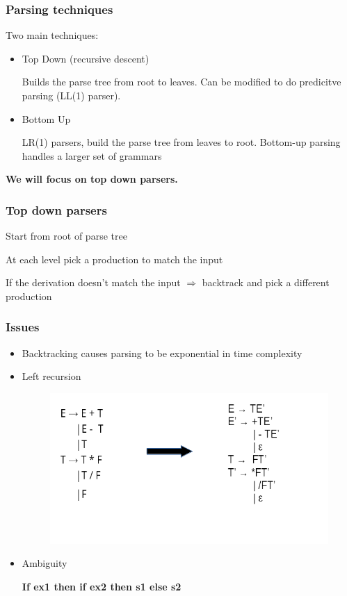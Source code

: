\begin{frame}
    \frametitle{Parsing techniques}
    Two main techniques:
    \begin{itemize}
        \item Top Down (recursive descent)
        
        Builds the parse tree from root to leaves. 
        Can be modified to do predicitve parsing (LL(1) parser).
        \item Bottom Up
        
        LR(1) parsers, build the parse tree from leaves to root. Bottom-up parsing handles a larger set of
        grammars
    \end{itemize}
   
    \textbf{We will focus on top down parsers.}
\end{frame}
\begin{frame}
    \frametitle{Top down parsers}
    \begin{block}{}Start from root of parse tree \end{block}
    \begin{block}{}At each level pick a production to match the input\end{block}
    \begin{block}{}If the derivation doesn't match the input $\Rightarrow$ backtrack and pick a different production\end{block}
\end{frame}

\begin{frame}
    \frametitle{Issues}
    \begin{itemize}
    \item Backtracking causes parsing to be exponential in time complexity
   
    \item Left recursion
        \begin{figure}
        \includegraphics[scale=0.35 ]{img/noleftrec.png}
        \end{figure}

    \item Ambiguity
       \begin{center}
           \textbf{If ex1 then if ex2 then s1 else s2}
       \end{center}
    \end{itemize}
  
  
\end{frame}